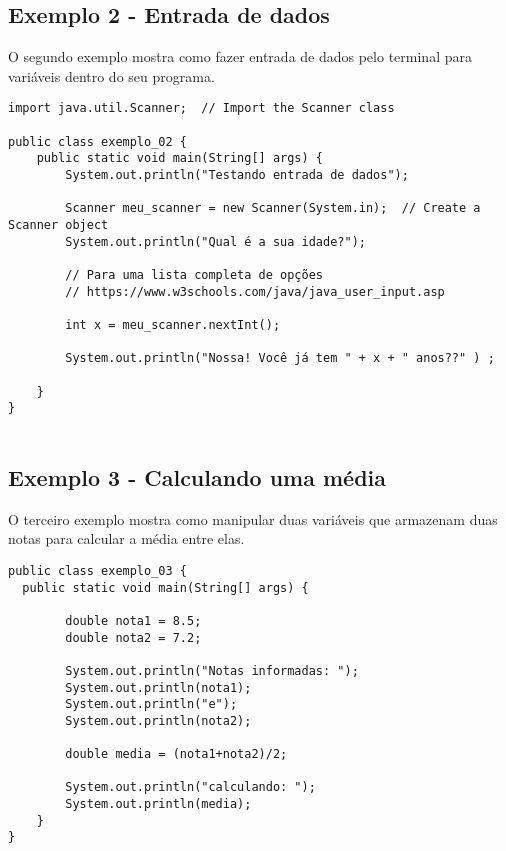 \documentclass[12pt]{article}
\begin{document}
\subsection{Exemplo 2 - Entrada de dados}

O segundo exemplo mostra como fazer entrada de dados pelo terminal para variáveis dentro do seu programa.

\begin{lstlisting}
import java.util.Scanner;  // Import the Scanner class

public class exemplo_02 {
	public static void main(String[] args) {
        System.out.println("Testando entrada de dados");
        
        Scanner meu_scanner = new Scanner(System.in);  // Create a Scanner object
        System.out.println("Qual é a sua idade?");

        // Para uma lista completa de opções 
        // https://www.w3schools.com/java/java_user_input.asp
        
        int x = meu_scanner.nextInt();  

        System.out.println("Nossa! Você já tem " + x + " anos??" ) ;       
        
    }
}


\end{lstlisting}


\subsection{Exemplo 3 - Calculando uma média}

O terceiro exemplo mostra como manipular duas variáveis que armazenam duas notas para calcular a média entre elas.

\begin{lstlisting}
public class exemplo_03 {
  public static void main(String[] args) {
              
        double nota1 = 8.5;
        double nota2 = 7.2;

        System.out.println("Notas informadas: ");
        System.out.println(nota1);
        System.out.println("e");
        System.out.println(nota2);        
        
        double media = (nota1+nota2)/2;

        System.out.println("calculando: ");
        System.out.println(media);       
    }
}
\end{lstlisting}
\end{document}
